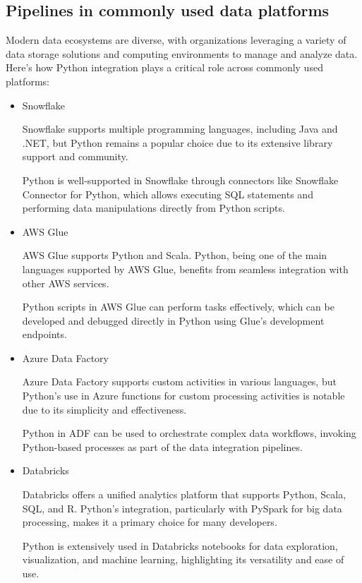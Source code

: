 \subsection{Pipelines in commonly used data platforms}

Modern data ecosystems are diverse, with organizations leveraging a variety of data storage solutions and computing environments to manage and analyze data. Here’s how Python integration plays a critical role across commonly used platforms:

\begin{itemize}

\item  Snowflake

Snowflake\cite{snowflake} supports multiple programming languages, including Java and .NET, but Python remains a popular choice due to its extensive library support and community.

Python is well-supported in Snowflake through connectors like Snowflake Connector for Python, which allows executing SQL statements and performing data manipulations directly from Python scripts.

\item AWS Glue

AWS Glue\cite{aws_glue} supports Python and Scala. Python, being one of the main languages supported by AWS Glue, benefits from seamless integration with other AWS services.

Python scripts in AWS Glue can perform  tasks effectively, which can be developed and debugged directly in Python using Glue’s development endpoints.

\item Azure Data Factory

Azure Data Factory\cite{azure_data_factory} supports custom activities in various languages, but Python’s use in Azure functions for custom processing activities is notable due to its simplicity and effectiveness.

Python in ADF can be used to orchestrate complex data workflows, invoking Python-based processes as part of the data integration pipelines.

\item Databricks

Databricks\cite{databricks} offers a unified analytics platform that supports Python, Scala, SQL, and R. Python’s integration, particularly with PySpark for big data processing, makes it a primary choice for many developers.

Python is extensively used in Databricks notebooks for data exploration, visualization, and machine learning, highlighting its versatility and ease of use.

\end{itemize}

